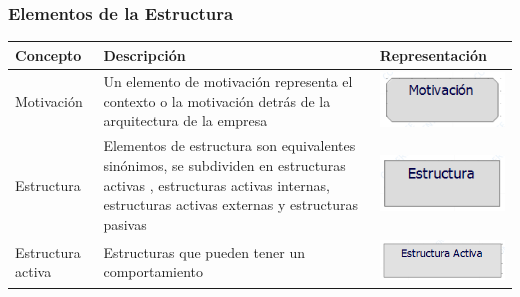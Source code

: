 \subsubsection{Elementos de la Estructura}
	\begin{table}[h!]
	\begin{tabular}{| m{7em} | m{7cm} | m{3cm} |}
		\hline
		Concepto & Descripción & Representación \\
		
		\hline
		Motivación
		& 
		Un elemento de motivación representa el contexto o la motivación detrás de la  arquitectura de la empresa
		& \includegraphics[width=0.8\linewidth, height=0.05\textheight]{imgs/conceptos/meta/Motivacion}
		\\
		
		\hline
		Estructura 
		& 
		Elementos de estructura son equivalentes sinónimos, se subdividen  en estructuras activas ,                              estructuras activas internas,  estructuras activas externas y estructuras pasivas
		& \includegraphics[width=0.8\linewidth, height=0.05\textheight]{imgs/conceptos/meta/Estructura}
		\\
		
		\hline
		Estructura activa  
		& 
		Estructuras que pueden tener un comportamiento
		& \includegraphics[width=0.8\linewidth, height=0.05\textheight]{imgs/conceptos/meta/EstructuraActiva}
		\\  
		

\end{tabular}
\end{table}
